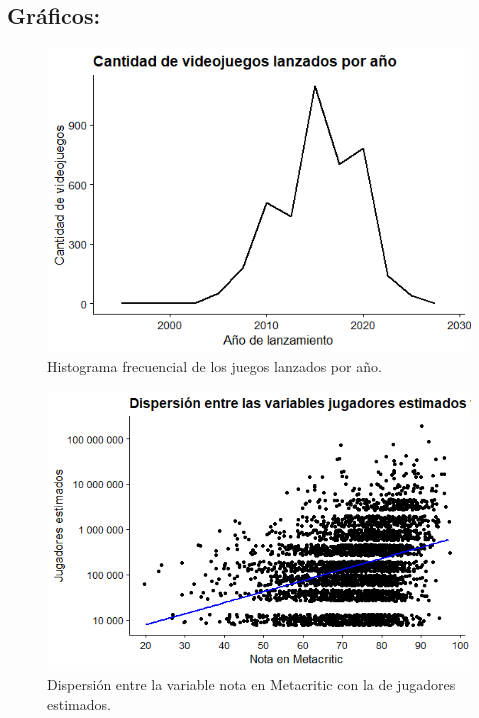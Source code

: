 \documentclass[
  letterpaper,
  DIV=11,
  numbers=noendperiod]{scrreprt}
\begin{document}
\hypertarget{gruxe1ficos}{%
\subsection{Gráficos:}\label{gruxe1ficos}}

\begin{figure}

{\centering \includegraphics[width=137mm,height=\textheight]{./FreqGamesPerYear.png}

}

\caption{Histograma frecuencial de los juegos lanzados por año.}

\end{figure}

\begin{figure}

{\centering \includegraphics[width=138mm,height=\textheight]{./imagenes/GamersAndCriticsRelations.png}

}

\caption{Dispersión entre la variable nota en Metacritic con la de
jugadores estimados.}

\end{figure}
\end{document}
